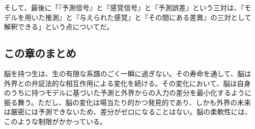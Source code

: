 そして、最後に「『予測信号』と『感覚信号』と『予測誤差』という三対は、『モデルを用いた推測』と『与えられた感覚』と『その間にある差異』の三対として解釈できる」という点についてだ。

\subsection{この章のまとめ}\label{ux3053ux306eux7ae0ux306eux307eux3068ux3081}

脳を持つ生は、生の有限な系譜のごく一瞬に過ぎない。その寿命を通して、脳は外界との弁証法的な相互作用による変化を続ける。その変化において、脳は自身のうちに持つモデルに基づいた予測と外界からの入力の差分を最小化するように振る舞う。ただし、脳の変化は場当たり的かつ発見的であり、しかも外界の未来は厳密には予測できないため、差分がゼロになることはない。脳の柔軟性には、このような制限がかかっている。
